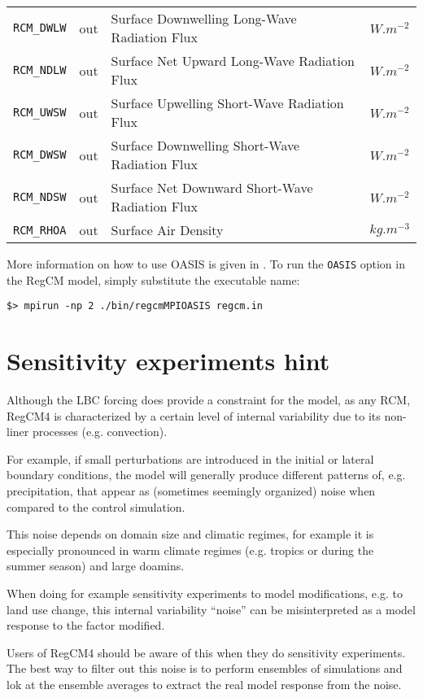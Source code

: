 \begin{table}[ht]
\begin{tabular}{l|c|l|c}
\verb=RCM_DWLW= & out & Surface Downwelling Long-Wave Radiation Flux & $W.m^{-2}$\\
\verb=RCM_NDLW= & out & Surface Net Upward Long-Wave Radiation Flux & $W.m^{-2}$\\
\verb=RCM_UWSW= & out & Surface Upwelling Short-Wave Radiation Flux & $W.m^{-2}$\\
\verb=RCM_DWSW= & out & Surface Downwelling Short-Wave Radiation Flux & $W.m^{-2}$\\
\verb=RCM_NDSW= & out & Surface Net Downward Short-Wave Radiation Flux & $W.m^{-2}$\\
\verb=RCM_RHOA= & out & Surface Air Density & $kg.m^{-3}$\\
\hline
\end{tabular}
\label{oasis_field_list}
\end{table}

More information on how to use OASIS is given in \cite{valcke_oasis}.
To run the \verb=OASIS= option in the RegCM model,
simply substitute the executable name:

\begin{Verbatim}
$> mpirun -np 2 ./bin/regcmMPIOASIS regcm.in
\end{Verbatim}

\section{Sensitivity experiments hint}

Although the LBC forcing does provide a constraint for the model, as any RCM,
RegCM4 is characterized by a certain level of internal variability due to its
non-liner processes (e.g. convection).

For example, if small perturbations are introduced in the initial or lateral
boundary conditions, the model will generally produce different patterns of,
e.g. precipitation, that appear as (sometimes seemingly organized) noise when
compared to the control simulation.

This noise depends on domain size and climatic regimes, for example it is
especially pronounced in warm climate regimes (e.g. tropics or during the
summer season) and large doamins.

When doing for example sensitivity experiments to model modifications, e.g. to
land use change, this internal variability “noise” can be misinterpreted as a
model response to the factor modified.

Users of RegCM4 should be aware of this when they do sensitivity experiments.
The best way to filter out this noise is to perform ensembles of simulations
and lok at the ensemble averages to extract the real model response from the
noise.
